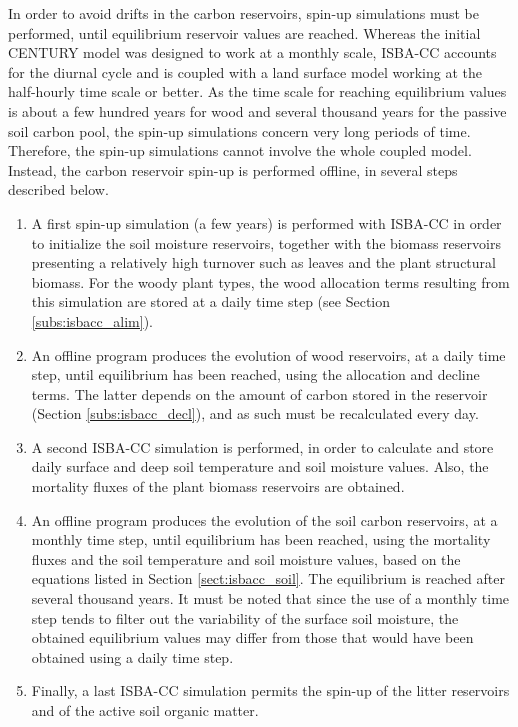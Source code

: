 {In order to avoid drifts in the carbon reservoirs, spin-up simulations must be performed, 
until equilibrium reservoir values are reached. 
Whereas the initial CENTURY model was designed to work at a monthly scale, ISBA-CC accounts for 
the diurnal cycle and is coupled with a land surface model working at the half-hourly time scale or better.
As the time scale for reaching equilibrium values is about a few hundred years for wood 
and several thousand years for the passive soil carbon pool, the spin-up simulations concern 
very long periods of time.
Therefore, the spin-up simulations cannot involve the whole coupled model. Instead, the carbon reservoir 
spin-up is performed offline, in several steps described below.

\begin{enumerate}
\item A first spin-up simulation (a few years) is performed with ISBA-CC in order to 
  initialize the soil moisture reservoirs, together with the biomass reservoirs presenting 
  a relatively high turnover such as leaves and the plant structural biomass. 
  For the woody plant types, the wood allocation terms resulting from this simulation are stored
  at a daily time step (see Section \ref{subs:isbacc_alim}).
\item An offline program produces the evolution of wood reservoirs, at a daily time step, 
  until equilibrium has been reached, using the allocation and decline terms. 
  The latter depends on the amount of carbon stored in the reservoir  
  (Section \ref{subs:isbacc_decl}), and as such must be recalculated every day.
\item A second ISBA-CC simulation is performed, in order to calculate and store daily surface and deep 
  soil temperature and soil moisture values. Also, the mortality fluxes of the plant biomass reservoirs 
  are obtained.
\item An offline program produces the evolution of the soil carbon reservoirs, at a monthly time step, 
  until equilibrium has been reached, using the mortality fluxes and the soil temperature and soil moisture values,
  based on the equations listed in Section \ref{sect:isbacc_soil}.
  The equilibrium is reached after several thousand years. It must be noted that since the use 
  of a monthly time step tends to filter out
  the variability of the surface soil moisture, the obtained equilibrium values may 
  differ from those that would have been obtained using a daily time step.
\item Finally, a last ISBA-CC simulation permits the spin-up
  of the litter reservoirs and of the active soil organic matter.
\end{enumerate}

}
